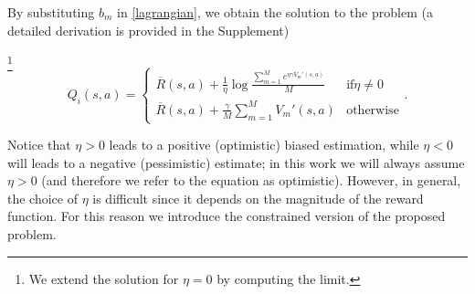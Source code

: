 By substituting $b_m$ in \eqref{lagrangian}, we obtain the solution to the problem (a detailed derivation is provided in the Supplement)
\begin{obedef}\footnote{We extend the solution for $\eta = 0$ by computing the limit.} 
	\begin{equation}
	Q_i(s,a) = \begin{cases}
	\overline{R}(s,a) + \frac{1}{\eta} \log \frac{\sum_{m=1}^Me^{\eta \gamma  V_m'(s,a) }}{M} & \mathrm{if} \eta \neq 0 \label{OBE} \\
	\overline{R}(s,a) + \frac{\gamma}M \sum_{m=1}^{M} V_m'(s,a) & \mathrm{otherwise}
	\end{cases}.
	\end{equation}
\end{obedef}
Notice that $\eta>0$ leads to a positive (optimistic) biased estimation, while $\eta<0$ will leads to a negative (pessimistic) estimate; in this work we will always assume $\eta>0$ (and therefore we refer to the equation as optimistic). 
However, in general, the choice of $\eta$ is difficult since it depends on the magnitude of the reward function. For this reason we introduce the constrained version of the proposed problem.
 
